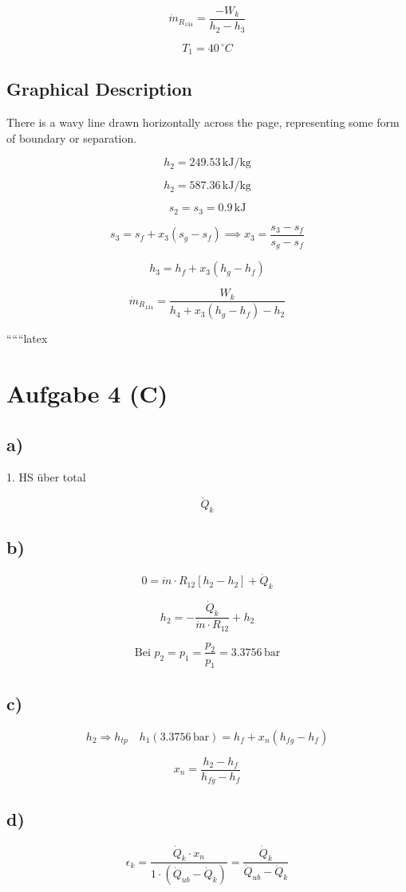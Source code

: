 \[
\dot{m}_{R_{134}} = \frac{-W_k}{h_2 - h_3}
\]

\[
T_1 = 40 \, ^\circ C
\]

\subsection*{Graphical Description}

There is a wavy line drawn horizontally across the page, representing some form of boundary or separation.

\[
h_2 = 249.53 \, \text{kJ/kg}
\]

\[
h_2 = 587.36 \, \text{kJ/kg}
\]

\[
s_2 = s_3 = 0.9 \, \text{kJ}
\]

\[
s_3 = s_f + x_3 (s_g - s_f) \implies x_3 = \frac{s_3 - s_f}{s_g - s_f}
\]

\[
h_3 = h_f + x_3 (h_g - h_f)
\]

\[
\dot{m}_{R_{134}} = \frac{W_k}{h_4 + x_3 (h_g - h_f) - h_2}
\]

``````latex


\section*{Aufgabe 4 (C)}

\subsection*{a)}
1. HS über total

\[
\boxed{\dot{Q}_k}
\]

\subsection*{b)}
\[
0 = \dot{m} \cdot R_{12} \left[ h_{2} - h_{2} \right] + \dot{Q}_k
\]

\[
h_2 = -\frac{\dot{Q}_k}{\dot{m} \cdot R_{12}} + h_2
\]

\[
\text{Bei } p_2 = p_1 = \frac{p_2}{p_1} = 3.3756 \, \text{bar}
\]

\subsection*{c)}
\[
h_2 \Rightarrow h_{tp} \quad h_1 (3.3756 \, \text{bar}) = h_f + x_n (h_{fg} - h_f)
\]

\[
x_n = \frac{h_2 - h_f}{h_{fg} - h_f}
\]

\subsection*{d)}
\[
\epsilon_k = \frac{\dot{Q}_k \cdot x_n}{1 \cdot \left( \dot{Q}_{ub} - \dot{Q}_k \right)} = \frac{\dot{Q}_k}{\dot{Q}_{ub} - \dot{Q}_k}
\]

